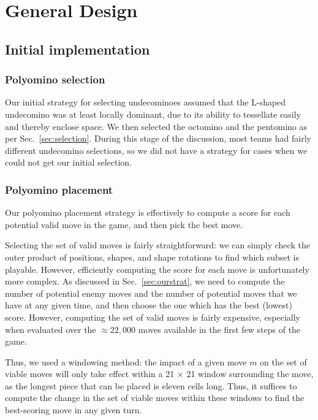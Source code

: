 \documentclass{scrartcl}
\begin{document}

\section{General Design} %

\subsection{Initial implementation}
\subsubsection{Polyomino selection}
Our initial strategy for selecting undecominoes assumed that the L-shaped undecomino was at least locally dominant, due to its ability to tessellate easily and thereby enclose space. We then selected the octomino and the pentomino as per Sec.~\ref{sec:selection}. During this stage of the discussion, most teams had fairly different undecomino selections, so we did not have a strategy for cases when we could not get our initial selection.

\subsubsection{Polyomino placement}
Our polyomino placement strategy is effectively to compute a score for each potential valid move in the game, and then pick the best move.

Selecting the set of valid moves is fairly straightforward: we can simply check the outer product of positions, shapes, and shape rotations to find which subset is playable. However, efficiently computing the score for each move is unfortunately more complex. As discussed in Sec.~\ref{sec:ourstrat}, we need to compute the number of potential enemy moves and the number of potential moves that we have at any given time, and then choose the one which has the best (lowest) score. However, computing the set of valid moves is fairly expensive, especially when evaluated over the $\approx 22,000$ moves available in the first few steps of the game.

Thus, we used a windowing method: the impact of a given move $m$ on the set of viable moves will only take effect within a 21 $\times$ 21 window surrounding the move, as the longest piece that can be placed is eleven cells long. Thus, it suffices to compute the change in the set of viable moves within these windows to find the best-scoring move in any given turn.
\end{document}
